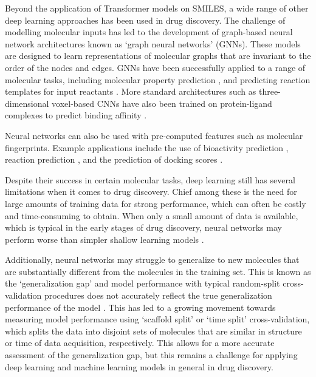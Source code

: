Beyond the application of Transformer models on SMILES, a wide range of other deep learning approaches has been used in drug discovery. The challenge of modelling molecular inputs has led to the development of graph-based neural network architectures known as `graph neural networks' (GNNs). These models are designed to learn representations of molecular graphs that are invariant to the order of the nodes and edges. GNNs have been successfully applied to a range of molecular tasks, including molecular property prediction \cite{wu2017molnet, Gilmer17mpnn, Mayr2018compare, yang2019chemprop}, and predicting reaction templates for input reactants \cite{Coley19WLDN5}. More standard architectures such as three-dimensional voxel-based CNNs have also been trained on protein-ligand complexes to predict binding affinity \cite{Ragoza2017ProteinCNN, Imrie2018ProteinCNN, Jimenez2018Kdeep}.

Neural networks can also be used with pre-computed features such as molecular fingerprints. Example applications include the use of bioactivity prediction \cite{Bender2019}, reaction prediction \cite{Wei2016reactionprediction, segler2017neural}, and the prediction of docking scores \cite{Gentile2020deepdocking}.

Despite their success in certain molecular tasks, deep learning still has several limitations when it comes to drug discovery. Chief among these is the need for large amounts of training data for strong performance, which can often be costly and time-consuming to obtain. When only a small amount of data is available, which is typical in the early stages of drug discovery, neural networks may perform worse than simpler shallow learning models \cite{Jiang2021benchmark}. 

Additionally, neural networks may struggle to generalize to new molecules that are substantially different from the molecules in the training set. This is known as the `generalization gap' and model performance with typical random-split cross-validation procedures does not accurately reflect the true generalization performance of the model \cite{Sheridan2013TimeSplit}. This has led to a growing movement towards measuring model performance using `scaffold split' \cite{wu2017molnet, yang2019chemprop} or `time split' \cite{Sheridan2013TimeSplit} cross-validation, which splits the data into disjoint sets of molecules that are similar in structure or time of data acquisition, respectively. This allows for a more accurate assessment of the generalization gap, but this remains a challenge for applying deep learning and machine learning models in general in drug discovery.

